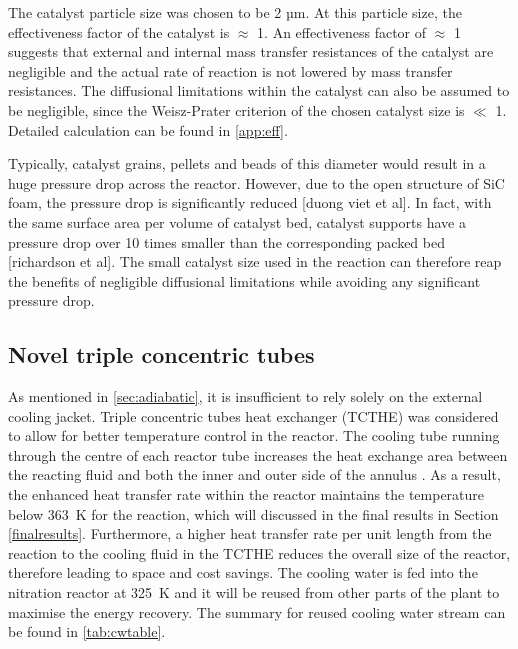 The catalyst particle size was chosen to be 2 µm. At this particle size, the effectiveness factor of the catalyst is $\approx$ 1. An effectiveness factor of $\approx$ 1 suggests that external and internal mass transfer resistances of the catalyst are negligible and the actual rate of reaction is not lowered by mass transfer resistances. The diffusional limitations within the catalyst can also be assumed to be negligible, since the Weisz-Prater criterion of the chosen catalyst size is $\ll$ 1. Detailed calculation can be found in \cref{app:eff}.

Typically, catalyst grains, pellets and beads of this diameter would result in a huge pressure drop across the reactor. However, due to the open structure of SiC foam, the pressure drop is significantly reduced [duong viet et al]. In fact, with the same surface area per volume of catalyst bed, catalyst supports have a pressure drop over 10 times smaller than the corresponding packed bed [richardson et al]. The small catalyst size used in the reaction can therefore reap the benefits of negligible diffusional limitations while avoiding any significant pressure drop.


\subsection{Novel triple concentric tubes}
\label{sec:tripleconctube}
As mentioned in \cref{sec:adiabatic}, it is insufficient to rely solely on the external cooling jacket. Triple concentric tubes heat exchanger (TCTHE) was considered to allow for better temperature control in the reactor. The cooling tube running through the centre of each reactor tube increases the heat exchange area between the reacting fluid and both the inner and outer side of the annulus \cite{moya-rico_characterization_2019}. As a result, the enhanced heat transfer rate within the reactor maintains the temperature below \SI{363}{\K} for the reaction, which will discussed in the final results in Section \ref{finalresults}. Furthermore, a higher heat transfer rate per unit length from the reaction to the cooling fluid in the TCTHE reduces the overall size of the reactor, therefore leading to space and cost savings. The cooling water is fed into the nitration reactor at \SI{325}{\K} and it will be reused from other parts of the plant to maximise the energy recovery. The summary for reused cooling water stream can be found in \cref{tab:cwtable}.

